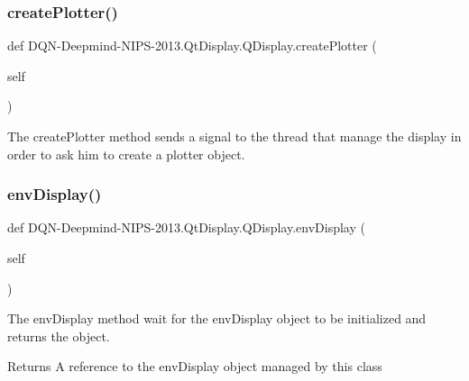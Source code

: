 \subsubsection{\texorpdfstring{create\+Plotter()}{createPlotter()}}
{\footnotesize\ttfamily def D\+QN-\/Deepmind-\/N\+I\+PS-\/2013.Qt\+Display.\+Q\+Display.\+create\+Plotter (\begin{DoxyParamCaption}\item[{}]{self }\end{DoxyParamCaption})}



The create\+Plotter method sends a signal to the thread that manage the display in order to ask him to create a plotter object. 

\hypertarget{classDQN-Deepmind-NIPS-2013_1_1QtDisplay_1_1QDisplay_a50d2c693245a9a3f617ed2295e4d87f3}{}\label{classDQN-Deepmind-NIPS-2013_1_1QtDisplay_1_1QDisplay_a50d2c693245a9a3f617ed2295e4d87f3} 
\subsubsection{\texorpdfstring{env\+Display()}{envDisplay()}}
{\footnotesize\ttfamily def D\+QN-\/Deepmind-\/N\+I\+PS-\/2013.Qt\+Display.\+Q\+Display.\+env\+Display (\begin{DoxyParamCaption}\item[{}]{self }\end{DoxyParamCaption})}



The env\+Display method wait for the env\+Display object to be initialized and returns the object. 

\begin{DoxyReturn}{Returns}
A reference to the env\+Display object managed by this class 
\end{DoxyReturn}
\hypertarget{classDQN-Deepmind-NIPS-2013_1_1QtDisplay_1_1QDisplay_ac4d39e4b6aff27f85280f53878adee37}{}\label{classDQN-Deepmind-NIPS-2013_1_1QtDisplay_1_1QDisplay_ac4d39e4b6aff27f85280f53878adee37} 
